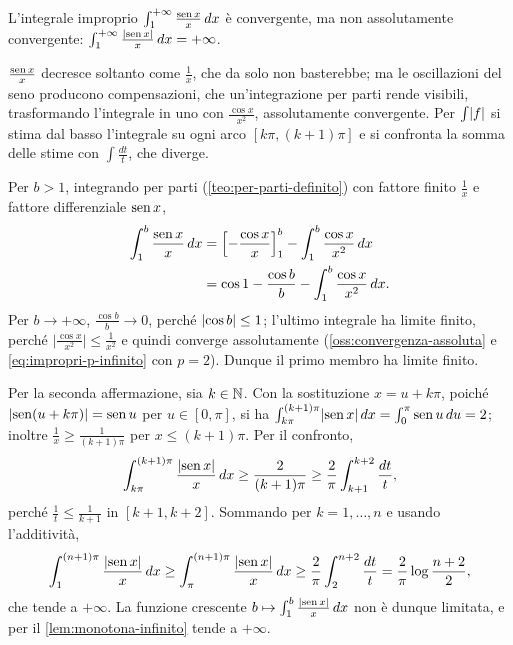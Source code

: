 \begin{proposizione}\label{prop:seno-su-x}
L'integrale improprio $\int_{1}^{+\infty}\frac{\operatorname{sen} x}x\,dx$ è convergente, ma non
assolutamente convergente: $\int_{1}^{+\infty}\frac{\lvert \operatorname{sen} x\rvert}x\,dx=+\infty$.
\end{proposizione}

\begin{schema}
\Ipotesi{$f(x)=\frac{\sen x}x$, continua in $[1,+\infty)$.}
\end{schema}

\begin{strategia}
$\frac{\operatorname{sen} x}x$ decresce soltanto come $\frac1x$, che da solo non basterebbe; ma le
oscillazioni del seno producono compensazioni, che un'integrazione per parti rende
visibili, trasformando l'integrale in uno con $\frac{\cos x}{x^{2}}$, assolutamente
convergente. Per $\int\lvert f\rvert$ si stima dal basso l'integrale su ogni arco
$[k\pi,(k+1)\pi]$ e si confronta la somma delle stime con $\int\frac{dt}t$, che diverge.
\end{strategia}

\begin{dimostrazione}
Per $b>1$, integrando per parti (\cref{teo:per-parti-definito}) con fattore finito
$\frac1x$ e fattore differenziale $\operatorname{sen} x$,
\begin{equation}\label{eq:seno-su-x-parti}
\begin{split}
  \int_{1}^{b}\frac{\operatorname{sen} x}x\,dx&=\Bigl[-\frac{\cos x}x\Bigr]_{1}^{b}
  -\int_{1}^{b}\frac{\cos x}{x^{2}}\,dx\\
  &=\cos1-\frac{\cos b}b-\int_{1}^{b}\frac{\cos x}{x^{2}}\,dx .
\end{split}
\end{equation}
Per $b\to+\infty$, $\frac{\cos b}b\to0$, perché $\lvert \cos b\rvert\le1$; l'ultimo integrale ha limite
finito, perché $\bigl|\frac{\cos x}{x^{2}}\bigr|\le\frac1{x^{2}}$ e quindi converge assolutamente
(\cref{oss:convergenza-assoluta} e \eqref{eq:impropri-p-infinito} con $p=2$). Dunque il primo
membro ha limite finito.

Per la seconda affermazione, sia $k\in\mathbb{N}$. Con la sostituzione $x=u+k\pi$, poiché
$\lvert \operatorname{sen}(u+k\pi)\rvert=\operatorname{sen} u$ per $u\in[0,\pi]$, si ha
$\int_{k\pi}^{(k+1)\pi}\lvert \operatorname{sen} x\rvert\,dx=\int_{0}^{\pi}\operatorname{sen} u\,du=2$; inoltre
$\frac1x\ge\frac1{(k+1)\pi}$ per $x\le(k+1)\pi$. Per il confronto,
\[
  \int_{k\pi}^{(k+1)\pi}\frac{\lvert \operatorname{sen} x\rvert}x\,dx\ge\frac2{(k+1)\pi}
  \ge\frac2\pi\int_{k+1}^{k+2}\frac{dt}t ,
\]
perché $\frac1t\le\frac1{k+1}$ in $[k+1,k+2]$. Sommando per $k=1,\dots,n$ e usando l'additività,
\[
  \int_{1}^{(n+1)\pi}\frac{\lvert \operatorname{sen} x\rvert}x\,dx\ge\int_{\pi}^{(n+1)\pi}\frac{\lvert \operatorname{sen} x\rvert}x\,dx
  \ge\frac2\pi\int_{2}^{n+2}\frac{dt}t=\frac2\pi\log\frac{n+2}2 ,
\]
che tende a $+\infty$. La funzione crescente $b\mapsto\int_{1}^{b}\frac{\lvert \operatorname{sen} x\rvert}x\,dx$ non è
dunque limitata, e per il \cref{lem:monotona-infinito} tende a $+\infty$.
\end{dimostrazione}

